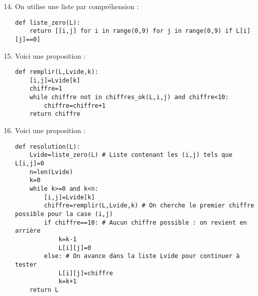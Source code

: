 \documentclass[a4paper,9pt]{report}
\begin{document}
\bigskip

\begin{center}
\end{center}

\medskip


\begin{enumerate}
\setcounter{enumi}{13}
\item On utilise une liste par compréhension :
\begin{center}
\begin{minipage}{0.9\textwidth}
		
\begin{lstlisting}
def liste_zero(L):
    return [[i,j] for i in range(0,9) for j in range(0,9) if L[i][j]==0]
\end{lstlisting}
\end{minipage}
\end{center}
\item Voici une proposition :
\begin{center}
\begin{minipage}{0.7\textwidth}
		
\begin{lstlisting}
def remplir(L,Lvide,k):
    [i,j]=Lvide[k]
    chiffre=1
    while chiffre not in chiffres_ok(L,i,j) and chiffre<10:
        chiffre=chiffre+1
    return chiffre 
\end{lstlisting}
\end{minipage}
\end{center}
\item Voici une proposition :

\begin{center}
\begin{minipage}{0.9\textwidth}
		
\begin{lstlisting}
def resolution(L):
    Lvide=liste_zero(L) # Liste contenant les (i,j) tels que L[i,j]=0
    n=len(Lvide)
    k=0
    while k>=0 and k<n: 
        [i,j]=Lvide[k]
        chiffre=remplir(L,Lvide,k) # On cherche le premier chiffre possible pour la case (i,j)
        if chiffre==10: # Aucun chiffre possible : on revient en arrière
            k=k-1
            L[i][j]=0
        else: # On avance dans la liste Lvide pour continuer à tester
            L[i][j]=chiffre
            k=k+1
    return L 
\end{lstlisting}
\end{minipage}
\end{center}


\end{enumerate}
\end{document}
